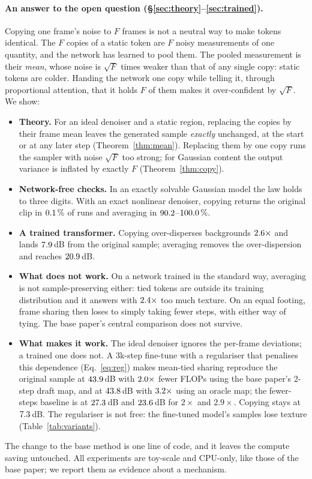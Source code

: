 \paragraph{An answer to the open question (\S\ref{sec:theory}--\ref{sec:trained}).}
Copying one frame's noise to $F$ frames is not a neutral way to make tokens identical.
The $F$ copies of a static token are $F$ noisy measurements of one quantity, and the network has learned to pool them.
The pooled measurement is their \emph{mean}, whose noise is $\sqrt F$ times weaker than that of any single copy: static tokens are colder.
Handing the network one copy while telling it, through proportional attention, that it holds $F$ of them makes it over-confident by $\sqrt F$.
We show:
\begin{itemize}[leftmargin=1.2em,itemsep=1pt,topsep=2pt]
\item \textbf{Theory.} For an ideal denoiser and a static region, replacing the copies by their frame mean leaves the generated sample \emph{exactly} unchanged, at the start or at any later step (Theorem~\ref{thm:mean}). Replacing them by one copy runs the sampler with noise $\sqrt F$ too strong; for Gaussian content the output variance is inflated by exactly $F$ (Theorem~\ref{thm:copy}).
\item \textbf{Network-free checks.} In an exactly solvable Gaussian model the law holds to three digits. With an exact nonlinear denoiser, copying returns the original clip in $0.1\,\%$ of runs and averaging in $90.2$--$100.0\,\%$.
\item \textbf{A trained transformer.} Copying over-disperses backgrounds $2.6\times$ and lands $7.9$\,dB from the original sample; averaging removes the over-dispersion and reaches $20.9$\,dB.
\item \textbf{What does not work.} On a network trained in the standard way, averaging is not sample-preserving either: tied tokens are outside its training distribution and it answers with $2.4\times$ too much texture. On an equal footing, frame sharing then loses to simply taking fewer steps, with either way of tying. The base paper's central comparison does not survive.
\item \textbf{What makes it work.} The ideal denoiser ignores the per-frame deviations; a trained one does not. A 3k-step fine-tune with a regulariser that penalises this dependence (Eq.~\ref{eq:reg}) makes mean-tied sharing reproduce the original sample at $43.9$\,dB with $2.0\times$ fewer FLOPs using the base paper's 2-step draft map, and at $43.8$\,dB with $3.2\times$ using an oracle map; the fewer-steps baseline is at $27.3$\,dB and $23.6$\,dB for $2\times$ and $2.9\times$. Copying stays at $7.3$\,dB. The regulariser is not free: the fine-tuned model's samples lose texture (Table~\ref{tab:variants}).
\end{itemize}
The change to the base method is one line of code, and it leaves the compute saving untouched.
All experiments are toy-scale and CPU-only, like those of the base paper; we report them as evidence about a mechanism.
